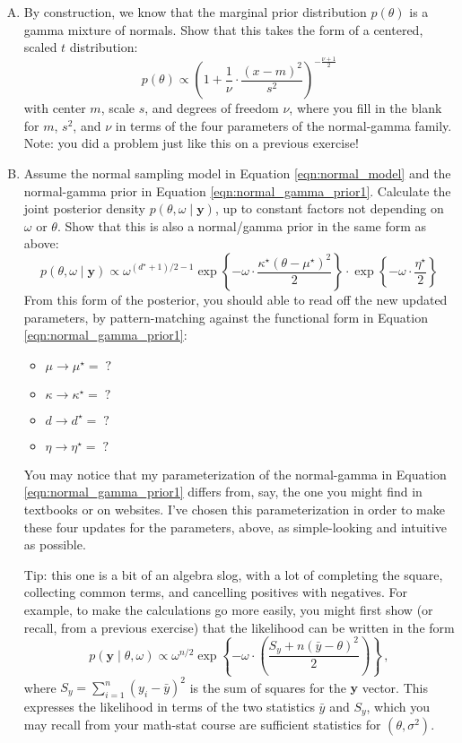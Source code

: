 \documentclass{mynotes}
\newcommand{\by}{\textbf{y}}
\begin{document}
\begin{enumerate}[(A)]


\item By construction, we know that the marginal prior distribution $p(\theta)$ is a gamma mixture of normals.  Show that this takes the form of a centered, scaled $t$ distribution: 
$$
p(\theta) \propto \left(1+ \frac{1}{\nu} \cdot \frac{(x - m)^2}{s^2}  \right)^{-\frac{\nu+1}{2}}
$$
with center $m$,  scale $s$, and degrees of freedom $\nu$, where you fill in the blank for $m$, $s^2$, and $\nu$ in terms of the four parameters of the normal-gamma family.  Note: you did a problem just like this on a previous exercise!


\item Assume the normal sampling model in Equation \ref{eqn:normal_model} and the normal-gamma prior in Equation \ref{eqn:normal_gamma_prior1}.  Calculate the joint posterior density $p(\theta, \omega \mid \textbf{y})$, up to constant factors not depending on $\omega$ or $\theta$.  Show that this is also a normal/gamma prior in the same form as above:
\begin{equation}
\label{eqn:normal_gamma_post}
p(\theta, \omega \mid \by) \propto \omega^{(d^\star+1)/2 - 1} \exp \left\{ - \omega \cdot \frac{\kappa^\star (\theta - \mu^\star)^2}{2}  \right\}
\cdot \exp\left\{ -  \omega \cdot \frac{\eta^\star}{2}  \right\} 
\end{equation}
From this form of the posterior, you should able to read off the new updated parameters, by pattern-matching against the functional form in Equation \ref{eqn:normal_gamma_prior1}:
\begin{itemize}
\item $\mu \longrightarrow \mu^\star =  \; ?$
\item $\kappa \longrightarrow \kappa^\star =  \; ?$
\item $d \longrightarrow d^{\star} =  \; ?$
\item $\eta \longrightarrow \eta^\star = \; ?$
\end{itemize}
You may notice that my parameterization of the normal-gamma in Equation \ref{eqn:normal_gamma_prior1} differs from, say, the one you might find in textbooks or on websites.  I've chosen this parameterization in order to make these four updates for the parameters, above, as simple-looking and intuitive as possible.


Tip: this one is a bit of an algebra slog, with a lot of completing the square, collecting common terms, and cancelling positives with negatives.  For example, to make the calculations go more easily, you might first show (or recall, from a previous exercise) that the likelihood can be written in the form
$$
p(\by \mid \theta, \omega) \propto \omega^{n/2} \exp \left\{ - \omega \cdot \left( \frac{S_y + n(\bar{y} - \theta)^2}{2} \right) \right\} \, ,
$$
where $S_y = \sum_{i=1}^n (y_i - \bar{y})^2$ is the sum of squares for the $\by$ vector.  This expresses the likelihood in terms of the two statistics $\bar{y}$ and $S_y$, which you may recall from your math-stat course are sufficient statistics for $(\theta, \sigma^2)$.


\end{enumerate}
\end{document}
